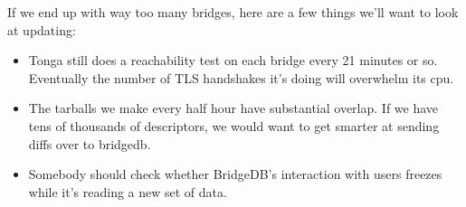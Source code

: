 \documentclass{article}
\begin{document}
If we end up with way too many bridges, here are a few things we'll want
to look at updating:

\begin{itemize}
\item Tonga still does a reachability test on each bridge every 21 minutes
or so.
Eventually the number of TLS handshakes it's doing will overwhelm its cpu.
\item The tarballs we make every half hour have substantial overlap.
If we have tens of thousands of descriptors, we would want to get smarter
at sending diffs over to bridgedb.
\item Somebody should check whether BridgeDB's interaction with users
freezes while it's reading a new set of data.
\end{itemize}

%
%
\end{document}
